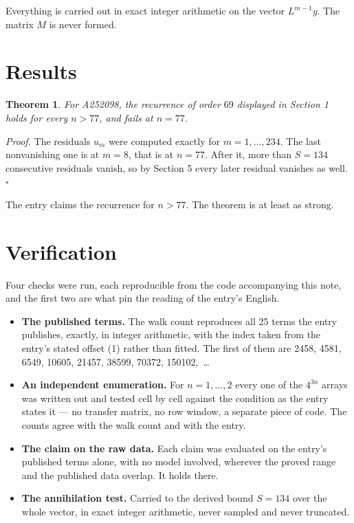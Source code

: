 \documentclass[11pt]{article}
\newtheorem{theorem}{Theorem}
\theoremstyle{definition}
\begin{document}
Everything is carried out in exact integer arithmetic on the vector $L^{m-1}y$. The matrix $M$ is never formed.

\section{Results}

\begin{theorem} For A252098, the recurrence of order $69$ displayed in Section 1 holds for every $n > 77$, and fails at $n = 77$.\end{theorem}

{\itshape Proof.} The residuals $u_m$ were computed exactly for $m = 1,\dots,234$. The last nonvanishing one is at $m = 8$, that is at $n = 77$. After it, more than $S = 134$ consecutive residuals vanish, so by Section 5 every later residual vanishes as well. $\square$

The entry claims the recurrence for $n > 77$. The theorem is at least as strong.

\section{Verification}

Four checks were run, each reproducible from the code accompanying this note, and the first two are what pin the reading of the entry's English.

\begin{itemize}

\item {\bfseries The published terms.} The walk count reproduces all 25 terms the entry publishes, exactly, in integer arithmetic, with the index taken from the entry's stated offset (1) rather than fitted. The first of them are 2458, 4581, 6549, 10605, 21457, 38599, 70372, 150102,~\dots

\item {\bfseries An independent enumeration.} For $n = 1,\dots,2$ every one of the $4^{3n}$ arrays was written out and tested cell by cell against the condition as the entry states it --- no transfer matrix, no row window, a separate piece of code. The counts agree with the walk count and with the entry.

\item {\bfseries The claim on the raw data.} Each claim was evaluated on the entry's published terms alone, with no model involved, wherever the proved range and the published data overlap. It holds there.

\item {\bfseries The annihilation test.} Carried to the derived bound $S = 134$ over the whole vector, in exact integer arithmetic, never sampled and never truncated.

\end{itemize}
\end{document}
